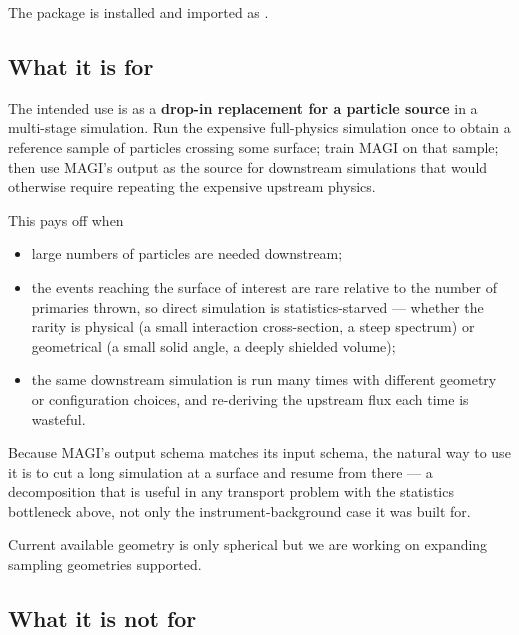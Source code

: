 \documentclass[11pt,a4paper]{article}
\begin{document}
The package is installed and imported as .

\subsection{What it is for}

The intended use is as a \textbf{drop-in replacement for a particle source} in
a multi-stage simulation. Run the expensive full-physics simulation once to
obtain a reference sample of particles crossing some surface; train MAGI on
that sample; then use MAGI's output as the source for downstream simulations
that would otherwise require repeating the expensive upstream physics.

This pays off when

\begin{itemize}[nosep]
  \item large numbers of particles are needed downstream;
  \item the events reaching the surface of interest are rare relative to the
    number of primaries thrown, so direct simulation is statistics-starved ---
    whether the rarity is physical (a small interaction cross-section, a steep
    spectrum) or geometrical (a small solid angle, a deeply shielded volume);
  \item the same downstream simulation is run many times with different
    geometry or configuration choices, and re-deriving the upstream flux each
    time is wasteful.
\end{itemize}

Because MAGI's output schema matches its input schema, the natural way to use
it is to cut a long simulation at a surface and resume from there --- a
decomposition that is useful in any transport problem with the statistics
bottleneck above, not only the instrument-background case it was built for.

Current available geometry is only spherical but we are working on expanding sampling geometries supported.

\subsection{What it is not for}
\end{document}
